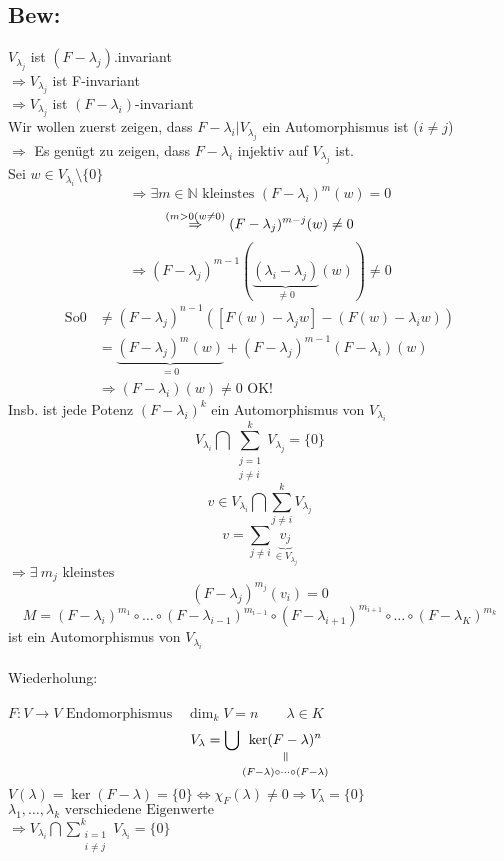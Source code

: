 \documentclass[titlepage,12pt,a4paper,ngerman]{report}
\newcommand{\verteq}{\rotatebox{90}{$\,=$}}
\newcommand{\equalto}[2]{\underset{\scriptstyle\overset{\mkern4mu\verteq}{#2}}{#1}}
\newcommand{\tx}[1]{\textrm{#1}}
\newcommand{\ub}[1]{\underbrace{#1}}
\newcommand{\enph}{F: V \to V \textrm{ Endomorphismus}}
\begin{document}
\subsection{Bew:}
$V_{\lambda_j}$ ist $(F-\lambda_j)$.invariant\\
$\Rightarrow V_{\lambda_j}$ ist F-invariant\\
$\Rightarrow V_{\lambda_j}$ ist $(F-\lambda_i)$-invariant\\
Wir wollen zuerst zeigen, dass $F-\lambda_i | V_{\lambda_j}$ ein Automorphismus ist ($i \neq j$)\\
$\Rightarrow$ Es genügt zu zeigen, dass $F-\lambda_i$ injektiv auf $V_{\lambda_j}$ ist.\\
Sei $w\in V_{\lambda_i} \setminus \{0\}$\\
$$\Rightarrow \exists m \in \mathbb{N} \tx{ kleinstes } (F-\lambda_i)^m(w) = 0$$
$$\buildrel ( m>0 (w\neq0) \over \Rightarrow (F-\lambda_j)^{m-j} (w) \neq 0$$
$$\Rightarrow (F-\lambda_j)^{m-1} (\ub{(\lambda_i - \lambda_j)}_{\neq 0} (w)) \neq 0$$
\begin{align*}
\tx{So} 0 &\neq (F-\lambda_j)^{n-1} ([F(w) - \lambda_j w] - (F(w) - \lambda_i w ))\\
&= \ub{(F-\lambda_j)^m(w)}_{=0} + (F-\lambda_j)^{m-1}(F-\lambda_i)(w)\\
&\Rightarrow (F-\lambda_i)(w) \neq 0 \tx{ OK!}
\end{align*}
Insb. ist jede Potenz $(F-\lambda_i)^k$ ein Automorphismus von $V_{\lambda_i}$
$$V_{\lambda_i} \bigcap \sum^k_{\substack{j=1 \\ j\neq i}} V_{\lambda_j} = \{0\}$$
$$v\in V_{\lambda_i} \bigcap \sum^k_{j\neq i} V_{\lambda_j}$$
$$ v = \sum_{j\neq i} \ub{v_j}_{\in V_{\lambda_j}}$$
$ \Rightarrow \exists \  m_j \tx{ kleinstes } $
$$(F-\lambda_j)^{m_j}(v_i) = 0$$
$$ M = (F-\lambda_i)^{m_1} \circ \dots \circ (F-\lambda_{i-1})^{m_{i-1}} \circ (F-\lambda_{i+1})^{m_{i+1}} \circ \dots \circ (F-\lambda_K)^{m_k}$$
ist ein Automorphismus von $ V_{\lambda_i}$\\\\



Wiederholung:\\\\
$\enph \quad \dim_k V = n \qquad \lambda \in K$
$$V_\lambda = \bigcup \equalto{\ker(F-\lambda)^n}{(F-\lambda)\circ \dots \circ (F-\lambda)}$$
$V(\lambda) = \ker (F-\lambda) = \{0\}  \Leftrightarrow \chi_F(\lambda) \neq 0 \Rightarrow V_\lambda = \{0\}$\\
$\lambda_1,\dots,\lambda_k \tx{ verschiedene Eigenwerte}$\\
$\Rightarrow V_{\lambda_i}  \bigcap \sum^k_{\substack{i=1 \\ i \neq j}} V_{\lambda_i} = \{0\}$
\end{document}
